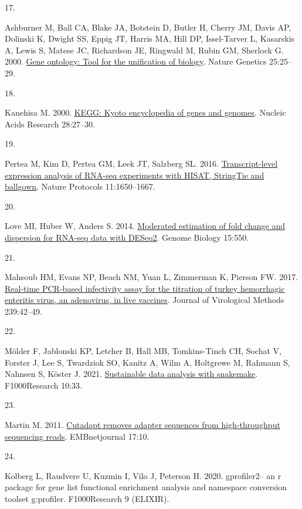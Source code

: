 \documentclass[
]{article}
\newlength{\cslhangindent}
\newlength{\csllabelwidth}
\newenvironment{CSLReferences}[2] %
 {\begin{list}{}{%
  \setlength{\itemindent}{0pt}
  \setlength{\leftmargin}{0pt}
  \setlength{\parsep}{0pt}
  \ifodd #1
   \setlength{\leftmargin}{\cslhangindent}
   \setlength{\itemindent}{-1\cslhangindent}
  \fi
  \setlength{\itemsep}{#2\baselineskip}}}
 {\end{list}}
\newcommand{\CSLLeftMargin}[1]{\parbox[t]{\csllabelwidth}{\strut#1\strut}}
\newcommand{\CSLRightInline}[1]{\parbox[t]{\linewidth - \csllabelwidth}{\strut#1\strut}}
\begin{document}
\begin{CSLReferences}{0}{1}
\CSLLeftMargin{17. }%
\CSLRightInline{Ashburner M, Ball CA, Blake JA, Botstein D, Butler H,
Cherry JM, Davis AP, Dolinski K, Dwight SS, Eppig JT, Harris MA, Hill
DP, Issel-Tarver L, Kasarskis A, Lewis S, Matese JC, Richardson JE,
Ringwald M, Rubin GM, Sherlock G. 2000.
\href{https://doi.org/10.1038/75556}{Gene ontology: Tool for the
unification of biology}. Nature Genetics 25:25--29.}

\CSLLeftMargin{18. }%
\CSLRightInline{Kanehisa M. 2000.
\href{https://doi.org/10.1093/nar/28.1.27}{KEGG: Kyoto encyclopedia of
genes and genomes}. Nucleic Acids Research 28:27--30.}

\CSLLeftMargin{19. }%
\CSLRightInline{Pertea M, Kim D, Pertea GM, Leek JT, Salzberg SL. 2016.
\href{https://doi.org/10.1038/nprot.2016.095}{Transcript-level
expression analysis of RNA-seq experiments with HISAT, StringTie and
ballgown}. Nature Protocols 11:1650--1667.}

\CSLLeftMargin{20. }%
\CSLRightInline{Love MI, Huber W, Anders S. 2014.
\href{https://doi.org/10.1186/s13059-014-0550-8}{Moderated estimation of
fold change and dispersion for RNA-seq data with DESeq2}. Genome Biology
15:550.}

\CSLLeftMargin{21. }%
\CSLRightInline{Mahsoub HM, Evans NP, Beach NM, Yuan L, Zimmerman K,
Pierson FW. 2017.
\href{https://doi.org/10.1016/j.jviromet.2016.11.002}{Real-time
{PCR}-based infectivity assay for the titration of turkey hemorrhagic
enteritis virus, an adenovirus, in live vaccines}. Journal of
Virological Methods 239:42--49.}

\CSLLeftMargin{22. }%
\CSLRightInline{Mölder F, Jablonski KP, Letcher B, Hall MB,
Tomkins-Tinch CH, Sochat V, Forster J, Lee S, Twardziok SO, Kanitz A,
Wilm A, Holtgrewe M, Rahmann S, Nahnsen S, Köster J. 2021.
\href{https://doi.org/10.12688/f1000research.29032.2}{Sustainable data
analysis with snakemake}. F1000Research 10:33.}

\CSLLeftMargin{23. }%
\CSLRightInline{Martin M. 2011.
\href{https://doi.org/10.14806/ej.17.1.200}{Cutadapt removes adapter
sequences from high-throughput sequencing reads}. EMBnetjournal 17:10.}

\CSLLeftMargin{24. }%
\CSLRightInline{Kolberg L, Raudvere U, Kuzmin I, Vilo J, Peterson H.
2020. gprofiler2-- an r package for gene list functional enrichment
analysis and namespace conversion toolset g:profiler. F1000Research 9
(ELIXIR).}


\end{CSLReferences}
\end{document}
